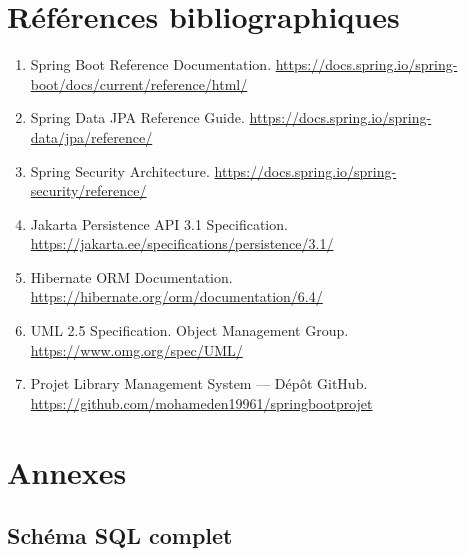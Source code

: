 \documentclass[12pt,a4paper,twoside]{report}
\begin{document}
\chapter*{Références bibliographiques}

\begin{enumerate}
    \item Spring Boot Reference Documentation. \url{https://docs.spring.io/spring-boot/docs/current/reference/html/}
    \item Spring Data JPA Reference Guide. \url{https://docs.spring.io/spring-data/jpa/reference/}
    \item Spring Security Architecture. \url{https://docs.spring.io/spring-security/reference/}
    \item Jakarta Persistence API 3.1 Specification. \url{https://jakarta.ee/specifications/persistence/3.1/}
    \item Hibernate ORM Documentation. \url{https://hibernate.org/orm/documentation/6.4/}
    \item UML 2.5 Specification. Object Management Group. \url{https://www.omg.org/spec/UML/}
    \item Projet Library Management System — Dépôt GitHub. \url{https://github.com/mohameden19961/springbootprojet}
\end{enumerate}

\appendix
\chapter{Annexes}

\section{Schéma SQL complet}
\end{document}
